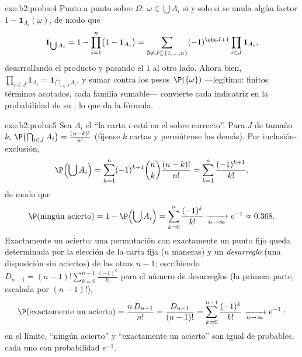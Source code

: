 \begin{solution}{exo:b2:proba:4}
Punto a punto sobre $\Omega$: $\omega \in \bigcup A_i$ si y solo si
se anula algún factor $1 - \mathbf{1}_{A_i}(\omega)$, de modo que
\[
\mathbf{1}_{\bigcup A_i}
= 1 - \prod_{i=1}^n\bigl(1 - \mathbf{1}_{A_i}\bigr)
= \sum_{\emptyset \neq J \subseteq \{1,\dots,n\}}
(-1)^{\abs J + 1}\prod_{i \in J}\mathbf{1}_{A_i} ,
\]
desarrollando el producto y pasando el $1$ al otro lado. Ahora bien,
$\prod_{i\in J}\mathbf{1}_{A_i} = \mathbf{1}_{\bigcap_{i \in J}
A_i}$, y sumar contra los pesos $\P(\{\omega\})$ ---legítimo:
finitos términos acotados, cada familia sumable--- convierte cada
indicatriz en la probabilidad de su , lo que da la fórmula.
\end{solution}

\begin{solution}{exo:b2:proba:5}
Sea $A_i$ el  ``la carta $i$ está en el sobre correcto''. Para
$J$ de tamaño $k$, $\P\bigl(\bigcap_{i\in J}A_i\bigr) =
\frac{(n-k)!}{n!}$ (fíjense $k$ cartas y permútense las demás). Por
inclusión-exclusión,
\[
\P\Bigl(\bigcup A_i\Bigr)
= \sum_{k=1}^n (-1)^{k+1}\binom nk \frac{(n-k)!}{n!}
= \sum_{k=1}^n \frac{(-1)^{k+1}}{k!} ,
\]
de modo que
\[
\P(\text{ningún acierto})
= 1 - \P\Bigl(\bigcup A_i\Bigr)
= \sum_{k=0}^{n}\frac{(-1)^k}{k!}
\xrightarrow[n\to\infty]{} e^{-1} \approx 0.368 .
\]
Exactamente un acierto: una permutación con exactamente un punto
fijo queda determinada por la elección de la carta fija ($n$ maneras)
y un \emph{desarreglo} (una disposición sin aciertos) de las otras $n
- 1$; escribiendo $D_{n-1} = (n-1)!\sum_{k=0}^{n-1}\frac{(-1)^k}{k!}$
para el número de desarreglos (la primera parte, escalada por
$(n-1)!$),
\[
\P(\text{exactamente un acierto})
= \frac{n\,D_{n-1}}{n!}
= \frac{D_{n-1}}{(n-1)!}
= \sum_{k=0}^{n-1}\frac{(-1)^k}{k!}
\xrightarrow[n\to\infty]{} e^{-1} :
\]
en el límite, ``ningún acierto'' y ``exactamente un acierto'' son
igual de probables, cada uno con probabilidad $e^{-1}$.
\end{solution}

